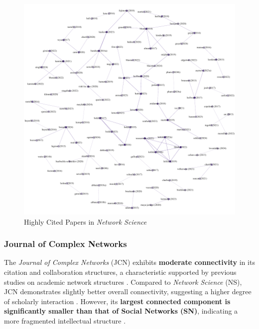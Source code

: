 \documentclass[twocolumn]{article}
\begin{document}
	\begin{figure}[htbp]
		\centering
		\includegraphics[width=\columnwidth]{"Network Science/Gephi/highly_cited.pdf"}
		\caption{Highly Cited Papers in \textit{Network Science}}
		\label{fig.fig5}
	\end{figure}
	
	\subsubsection*{Journal of Complex Networks}
	
	The \textit{Journal of Complex Networks} (JCN) exhibits \textbf{moderate connectivity} in its citation and collaboration structures, a characteristic supported by previous studies on academic network structures \cite{Newman2001, Liu2005}. Compared to \textit{Network Science} (NS), JCN demonstrates slightly better overall connectivity, suggesting a higher degree of scholarly interaction \cite{Barabasi2002}. However, its \textbf{largest connected component is significantly smaller than that of Social Networks (SN)}, indicating a more fragmented intellectual structure \cite{Otte2002, Borgatti2009}.
	
\end{document}
